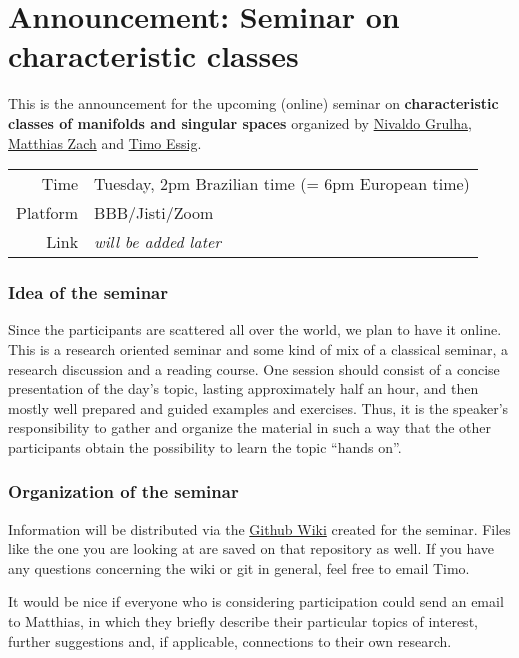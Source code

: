 \documentclass[a4paper]{article}
\begin{document}
\section*{Announcement: Seminar on characteristic classes}

This is the announcement for the upcoming (online) seminar on 
\textbf{characteristic classes of manifolds and singular spaces}
organized by 
\href{mailto:njunior@icmc.usp.br}{Nivaldo Grulha}, 
\href{mailto:zach@math.uni-hannover.de}{Matthias Zach} and 
\href{mailto:essig@math.uni-kiel.de}{Timo Essig}.

\begin{center}
	\begin{tabular}{rl}
		Time & Tuesday, 2pm Brazilian time (= 6pm European time) \\
		Platform & BBB/Jisti/Zoom \\
		Link & \emph{will be added later}
	\end{tabular}
\end{center}

\subsubsection*{Idea of the seminar} 
Since the participants are scattered all over the world, 
we plan to have it online. 
This is a research oriented seminar and some kind of mix of a classical seminar,
a research discussion and a reading course.
One session should consist of a concise presentation of the 
day's topic, lasting approximately half an hour, and then mostly well prepared and 
guided examples and exercises. Thus, it is the speaker's responsibility to gather 
and organize the material in such a way that the other participants obtain the 
possibility to learn the topic ``hands on''. 

\subsubsection*{Organization of the seminar}
Information will be distributed via the 
\href{https://github.com/timoessig/CCSingSem/wiki}{Github Wiki}
created for the seminar. Files like the one you are looking at are saved on that
repository as well. If you have any questions concerning the wiki or git in general,
feel free to email Timo.

It would be nice if everyone who is considering participation could send an 
email to Matthias, in which they briefly describe 
their particular topics of interest, further suggestions and, if applicable, 
connections to their own research. 
\end{document}
